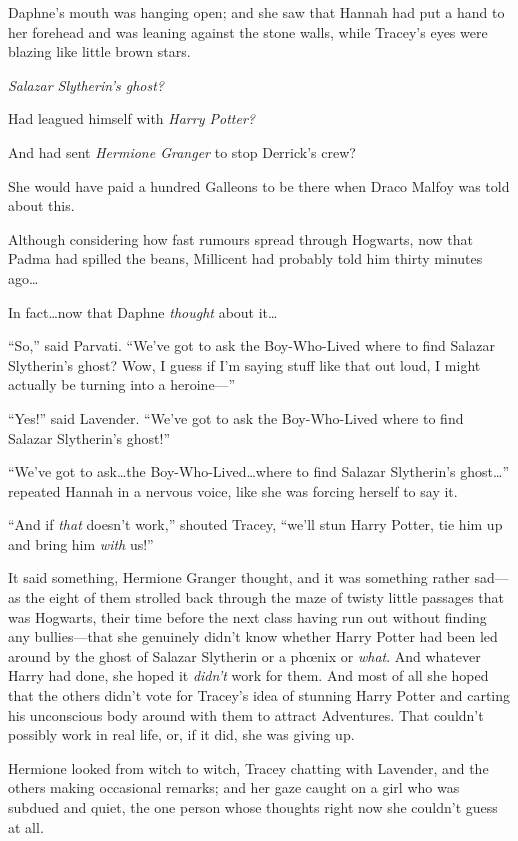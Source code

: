 Daphne’s mouth was hanging open; and she saw that Hannah had put a hand to her forehead and was leaning against the stone walls, while Tracey’s eyes were blazing like little brown stars.

\emph{Salazar Slytherin’s ghost?}

Had leagued himself with \emph{Harry Potter?}

And had sent \emph{Hermione Granger} to stop Derrick’s crew?

She would have paid a hundred Galleons to be there when Draco Malfoy was told about this.

Although considering how fast rumours spread through Hogwarts, now that Padma had spilled the beans, Millicent had probably told him thirty minutes ago…

In fact…now that Daphne \emph{thought} about it…

“So,” said Parvati. “We’ve got to ask the Boy-Who-Lived where to find Salazar Slytherin’s ghost? Wow, I guess if I’m saying stuff like that out loud, I might actually be turning into a heroine—”

“Yes!” said Lavender. “We’ve got to ask the Boy-Who-Lived where to find Salazar Slytherin’s ghost!”

“We’ve got to ask…the Boy-Who-Lived…where to find Salazar Slytherin’s ghost…” repeated Hannah in a nervous voice, like she was forcing herself to say it.

“And if \emph{that} doesn’t work,” shouted Tracey, “we’ll stun Harry Potter, tie him up and bring him \emph{with} us!”

\later

It said something, Hermione Granger thought, and it was something rather sad—as the eight of them strolled back through the maze of twisty little passages that was Hogwarts, their time before the next class having run out without finding any bullies—that she genuinely didn’t know whether Harry Potter had been led around by the ghost of Salazar Slytherin or a phœnix or \emph{what}. And whatever Harry had done, she hoped it \emph{didn’t} work for them. And most of all she hoped that the others didn’t vote for Tracey’s idea of stunning Harry Potter and carting his unconscious body around with them to attract Adventures. That couldn’t possibly work in real life, or, if it did, she was giving up.

Hermione looked from witch to witch, Tracey chatting with Lavender, and the others making occasional remarks; and her gaze caught on a girl who was subdued and quiet, the one person whose thoughts right now she couldn’t guess at all.

